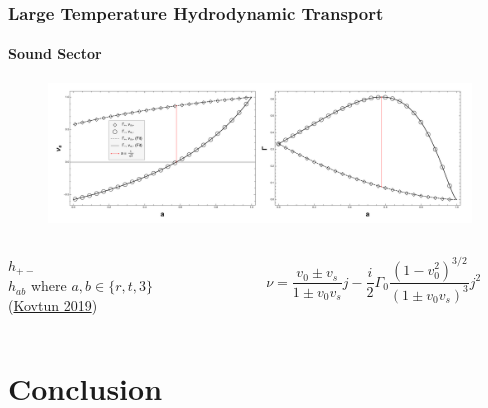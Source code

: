 \documentclass[aspectratio=169, xcolor=dvipsnames]{beamer}
\begin{document}
\begin{frame}
  \frametitle{Large Temperature Hydrodynamic Transport}
  \framesubtitle{Sound Sector}
  \begin{figure}
    \centering
    \includegraphics[width=0.9\paperwidth]{figs/scalar_rinf_hydro_DiffandPropOverA.pdf}
  \end{figure}

  \begin{columns}[c]
    \begin{column}{0.4\textwidth}
      \(h_{+-}\) \\ \(h_{ab}\) where \(a,b \in \{r,t,3\}\)\\
      (\href{https://inspirehep.net/literature/1744607}{Kovtun 2019})
    \end{column}

    \begin{column}{0.4\textwidth}
      \begin{equation*}
        \nu = \frac{v_0\pm v_s}{1\pm v_0 v_s} j - \frac{i}{2} {\Gamma_0} \frac{(1-v_0^2)^{3/2}}{(1\pm v_0 v_s)^3} j^2
      \end{equation*}
    \end{column}
  \end{columns}

\end{frame}  

\section{Conclusion}
\end{document}
